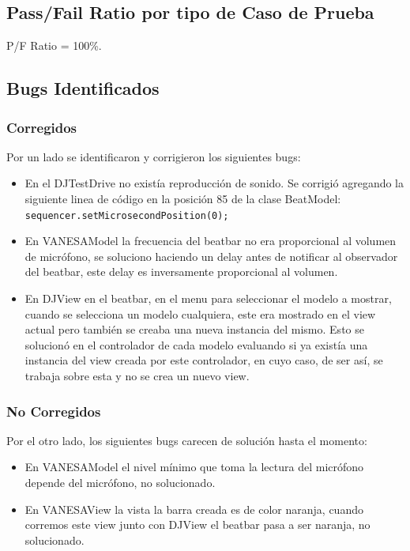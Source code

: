 \documentclass[10pt]{article} %
\begin{document}
\subsection{Pass/Fail Ratio por tipo de Caso de Prueba}
P/F Ratio = 100\%.

\subsection{Bugs Identificados}

\subsubsection{Corregidos}
Por un lado se identificaron y corrigieron los siguientes bugs:
\begin{itemize}
\item En el DJTestDrive no existía reproducción de sonido. Se corrigió agregando la siguiente linea de código en la posición 85 de la clase BeatModel:\\
\verb+sequencer.setMicrosecondPosition(0);+
\item En VANESAModel la frecuencia del beatbar no era proporcional al volumen de micrófono, se soluciono haciendo un delay antes de notificar al observador del beatbar, este delay es inversamente proporcional al volumen.
\item En DJView en el beatbar, en el menu para seleccionar el modelo a mostrar, cuando se selecciona un modelo cualquiera, este era mostrado en el view actual pero también se creaba una nueva instancia del mismo. Esto se solucionó en el controlador de cada modelo evaluando si ya existía una instancia del view creada por este controlador, en cuyo caso, de ser así, se trabaja sobre esta y no se crea un nuevo view.
\end{itemize}

\subsubsection{No Corregidos}
Por el otro lado, los siguientes bugs carecen de solución hasta el momento:
\begin{itemize}
\item En VANESAModel el nivel mínimo que toma la lectura del micrófono depende del micrófono, no solucionado.
\item En VANESAView la vista la barra creada es de color naranja, cuando corremos este view junto con DJView el beatbar pasa a ser naranja, no solucionado.
\end{itemize}
\end{document}
